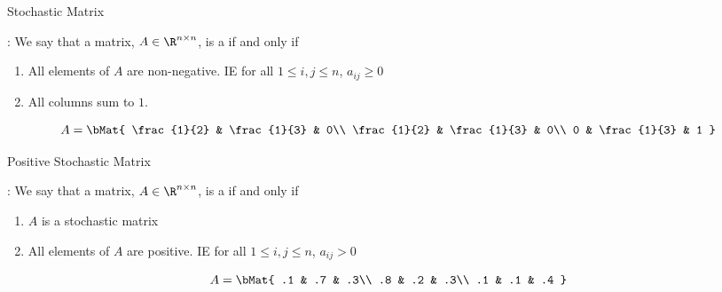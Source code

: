 \documentclass[xcoler=dvipsnames, aspectratio=169]{beamer}
\date{Brief Markov Chains Introduction}
\begin{document}
    \begin{frame}{Stochastic Matrix}
        \begin{defn}
            : We say that a matrix, $A\in\R^{n\times n}$, is a
             if and only if
            \begin{enumerate}
                \pause\item All elements of $A$ are non-negative.
                    IE for all $1\leq i,j\leq n$, $a_{ij}\geq 0$
                \pause\item All columns sum to $1$.
            \end{enumerate}
        \end{defn}\pause
        \begin{example}
            \[
                A = \bMat{
                    \frac{1}{2} & \frac{1}{3} & 0\\
                    \frac{1}{2} & \frac{1}{3} & 0\\
                    0 & \frac{1}{3} & 1
                }
            \]
        \end{example}
    \end{frame}
    \begin{frame}{Positive Stochastic Matrix}
        \begin{defn}
            : We say that a matrix, $A\in\R^{n\times n}$, is a
             if and only if
            \begin{enumerate}
                \pause\item $A$ is a stochastic matrix
                \pause\item All elements of $A$ are positive.
                    IE for all $1\leq i,j\leq n$, $a_{ij}> 0$
            \end{enumerate}
        \end{defn}\pause
        \begin{example}
            \[
                A = \bMat{
                    .1 & .7 & .3\\
                    .8 & .2 & .3\\
                    .1 & .1 & .4
                }
            \]
        \end{example}
    \end{frame}
\end{document}
